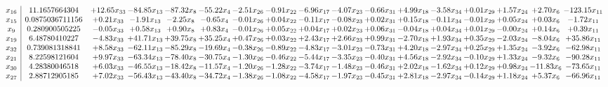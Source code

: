 \documentclass[9pt]{article}
\begin{document}
 \[\begin{array}{c| c c@{\hskip 2pt} c@{\hskip 2pt} c@{\hskip 2pt} c@{\hskip 2pt} c@{\hskip 2pt} c@{\hskip 2pt} c@{\hskip 2pt} c@{\hskip 2pt} c@{\hskip 2pt} c@{\hskip 2pt} c@{\hskip 2pt} c@{\hskip 2pt} c@{\hskip 2pt} c@{\hskip 2pt} c@{\hskip 2pt} }
 x_{16}   &  11.1657664304 & + 12.65 x_{33} & -84.85 x_{13} & -87.32 x_{8} & -55.22 x_{4} & -2.51 x_{26} & -0.91 x_{22} & -6.96 x_{17} & -4.07 x_{23} & -0.66 x_{31} & +  4.99 x_{18} & -3.58 x_{34} & +  0.01 x_{29} & +  1.57 x_{24} & +  2.70 x_{6} & -123.15 x_{11}\\
 x_{15}   &  0.0875036711156 & +  0.21 x_{33} & -1.91 x_{13} & -2.25 x_{8} & -0.65 x_{4} & -0.01 x_{26} & +  0.04 x_{22} & -0.11 x_{17} & -0.08 x_{23} & +  0.02 x_{31} & +  0.15 x_{18} & -0.11 x_{34} & -0.01 x_{29} & +  0.05 x_{24} & +  0.03 x_{6} & -1.72 x_{11}\\
 x_{9}   &  0.280900505225 & -0.05 x_{33} & +  0.58 x_{13} & +  0.90 x_{8} & +  0.83 x_{4} & -0.01 x_{26} & +  0.05 x_{22} & +  0.04 x_{17} & +  0.02 x_{23} & +  0.06 x_{31} & -0.04 x_{18} & +  0.04 x_{34} & +  0.01 x_{29} & -0.00 x_{24} & +  0.14 x_{6} & +  0.39 x_{11}\\
 x_{19}   &  6.48780410227 & -4.83 x_{33} & + 41.71 x_{13} & + 39.75 x_{8} & + 35.25 x_{4} & +  0.47 x_{26} & +  0.03 x_{22} & +  2.43 x_{17} & +  2.66 x_{23} & +  0.99 x_{31} & -2.70 x_{18} & +  1.93 x_{34} & +  0.35 x_{29} & -2.03 x_{24} & -8.04 x_{6} & + 35.86 x_{11}\\
 x_{32}   &  0.739081318841 & +  8.58 x_{33} & -62.11 x_{13} & -85.29 x_{8} & -19.69 x_{4} & -0.38 x_{26} & -0.89 x_{22} & -4.83 x_{17} & -3.01 x_{23} & -0.73 x_{31} & +  4.20 x_{18} & -2.97 x_{34} & +  0.25 x_{29} & +  1.35 x_{24} & -3.92 x_{6} & -62.98 x_{11}\\
 x_{21}   &  8.22598121604 & +  9.97 x_{33} & -63.34 x_{13} & -78.40 x_{8} & -30.75 x_{4} & -1.30 x_{26} & -0.46 x_{22} & -5.44 x_{17} & -3.35 x_{23} & -0.40 x_{31} & +  4.56 x_{18} & -2.92 x_{34} & -0.10 x_{29} & +  1.33 x_{24} & -9.32 x_{6} & -90.28 x_{11}\\
 x_{30}   &  4.28380046518 & +  6.03 x_{33} & -46.55 x_{13} & -18.42 x_{8} & -11.57 x_{4} & -1.20 x_{26} & -1.28 x_{22} & -3.74 x_{17} & -1.48 x_{23} & -0.46 x_{31} & +  2.02 x_{18} & -1.62 x_{34} & +  0.12 x_{29} & +  0.98 x_{24} & -11.83 x_{6} & -73.65 x_{11}\\
 x_{27}   &  2.88712905185 & +  7.02 x_{33} & -56.43 x_{13} & -43.40 x_{8} & -34.72 x_{4} & -1.38 x_{26} & -1.08 x_{22} & -4.58 x_{17} & -1.97 x_{23} & -0.45 x_{31} & +  2.81 x_{18} & -2.97 x_{34} & -0.14 x_{29} & +  1.18 x_{24} & +  5.37 x_{6} & -66.96 x_{11}\\

\end{array}\]
\end{document}
